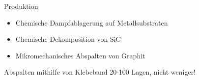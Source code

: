 \documentclass[../defence.tex]{subfiles}
\begin{document}
  \begin{frame}{Produktion}
    \begin{itemize}
      \item Chemische Dampfablagerung auf Metallsubstraten
      \item Chemische Dekomposition von SiC
      \item Mikromechanisches Abspalten von Graphit
    \end{itemize}
    \pause
    \begin{block}{Abspalten mithilfe von Klebeband}
      20-100 Lagen, nicht weniger!
    \end{block}
  \end{frame}
\end{document}
